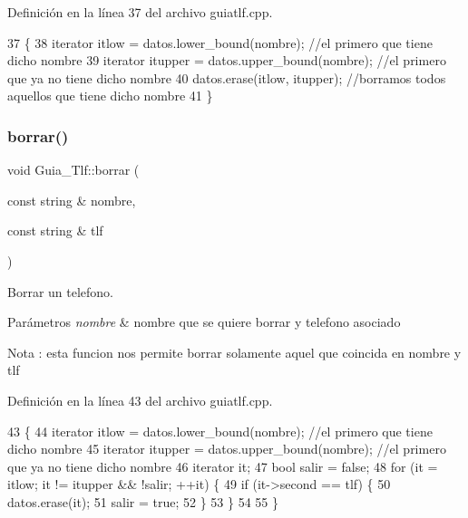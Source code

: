 Definición en la línea 37 del archivo guiatlf.\+cpp.


\begin{DoxyCode}
37                                           \{
38     iterator itlow = datos.lower\_bound(nombre); \textcolor{comment}{//el primero que tiene dicho nombre}
39     iterator itupper = datos.upper\_bound(nombre); \textcolor{comment}{//el primero que ya no tiene dicho nombre}
40     datos.erase(itlow, itupper); \textcolor{comment}{//borramos todos aquellos que tiene dicho nombre}
41 \}
\end{DoxyCode}
\mbox{\label{classGuia__Tlf_af8adac24fd35985b9016a4a38cca60f4}} 
\subsubsection{\texorpdfstring{borrar()}{borrar()}\hspace{0.1cm}{\footnotesize\ttfamily [2/2]}}
{\footnotesize\ttfamily void Guia\+\_\+\+Tlf\+::borrar (\begin{DoxyParamCaption}\item[{const string \&}]{nombre,  }\item[{const string \&}]{tlf }\end{DoxyParamCaption})}



Borrar un telefono. 


\begin{DoxyParams}{Parámetros}
{\em nombre} & nombre que se quiere borrar y telefono asociado \\
\hline
\end{DoxyParams}
\begin{DoxyNote}{Nota}
\+: esta funcion nos permite borrar solamente aquel que coincida en nombre y tlf 
\end{DoxyNote}


Definición en la línea 43 del archivo guiatlf.\+cpp.


\begin{DoxyCode}
43                                                              \{
44     iterator itlow = datos.lower\_bound(nombre); \textcolor{comment}{//el primero que tiene dicho nombre}
45     iterator itupper = datos.upper\_bound(nombre); \textcolor{comment}{//el primero que ya no tiene dicho nombre}
46     iterator it;
47     \textcolor{keywordtype}{bool} salir = \textcolor{keyword}{false};
48     \textcolor{keywordflow}{for} (it = itlow; it != itupper && !salir; ++it) \{
49         \textcolor{keywordflow}{if} (it->second == tlf) \{
50             datos.erase(it);
51             salir = \textcolor{keyword}{true};
52         \}
53     \}
54 
55 \}
\end{DoxyCode}
\mbox{\label{classGuia__Tlf_afe54faba93b8cd891cc150b9d8c9dbd5}} 

